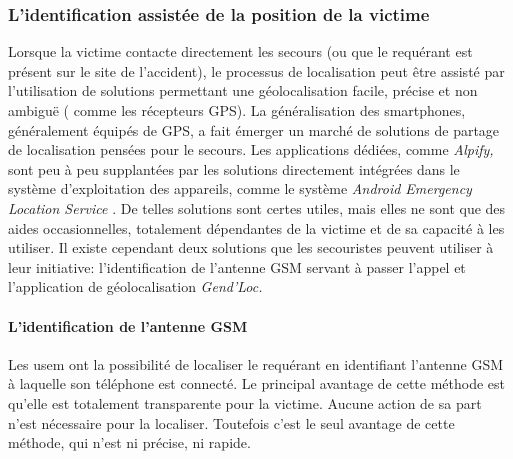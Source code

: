 \subsubsection{L'identification assistée de la position de la victime}
\label{subsec:1-1-2-2}

Lorsque la victime contacte directement les secours (ou que le
requérant est présent sur le site de l'accident), le processus de
localisation peut être assisté par l'utilisation de solutions
permettant une géolocalisation facile, précise et non ambiguë (\eg
comme les récepteurs GPS). La généralisation des smartphones,
généralement équipés de GPS, a fait émerger un marché de solutions de
partage de localisation pensées pour le secours. Les applications
dédiées, comme \emph{Alpify,} sont peu à peu supplantées par les
solutions directement intégrées dans le système d'exploitation des
appareils, comme le système \emph{Android Emergency Location Service}
\autocite{Google2019}. De telles solutions sont certes utiles, mais
elles ne sont que des aides occasionnelles, totalement dépendantes de
la victime et de sa capacité à les utiliser. Il existe cependant deux
solutions que les secouristes peuvent utiliser à leur initiative:
l'identification de l'antenne GSM servant à passer l'appel et
l'application de géolocalisation \emph{Gend'Loc.}

\paragraph{L'identification de l'antenne GSM}

Les \ac{usem} ont la possibilité de localiser le requérant en
identifiant l'antenne GSM à laquelle son téléphone est connecté. Le
principal avantage de cette méthode est qu'elle est totalement
transparente pour la victime. Aucune action de sa part n'est
nécessaire pour la localiser. Toutefois c'est le seul avantage de
cette méthode, qui n'est ni précise, ni rapide.

